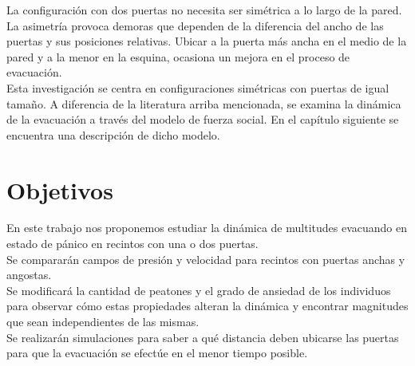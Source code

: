 La configuración con dos puertas no necesita ser simétrica a lo largo de la pared. La asimetría provoca demoras que dependen de la diferencia del ancho de las puertas y sus posiciones relativas. Ubicar a la puerta más ancha en el medio de la pared y a la menor en la esquina, ocasiona un mejora en el proceso de evacuación\cite{huanhuan1}.\\

Esta investigación se centra en configuraciones simétricas con puertas de igual tamaño. A diferencia de la literatura arriba mencionada, se examina la dinámica de la evacuación a través del modelo de fuerza social. En el capítulo siguiente se encuentra una descripción de dicho modelo. \\

\newpage

\section{Objetivos}

En este trabajo nos proponemos estudiar la dinámica de multitudes evacuando en estado de  pánico en recintos con una o dos puertas.\\ 

Se compararán campos de presión y velocidad para recintos con puertas anchas y angostas.\\

Se modificará la cantidad de peatones y el grado de ansiedad de los individuos para observar cómo estas propiedades alteran la dinámica y encontrar magnitudes que sean independientes de las mismas.\\

Se realizarán simulaciones para saber a qué distancia deben ubicarse las puertas para que la evacuación se efectúe en el menor tiempo posible.


